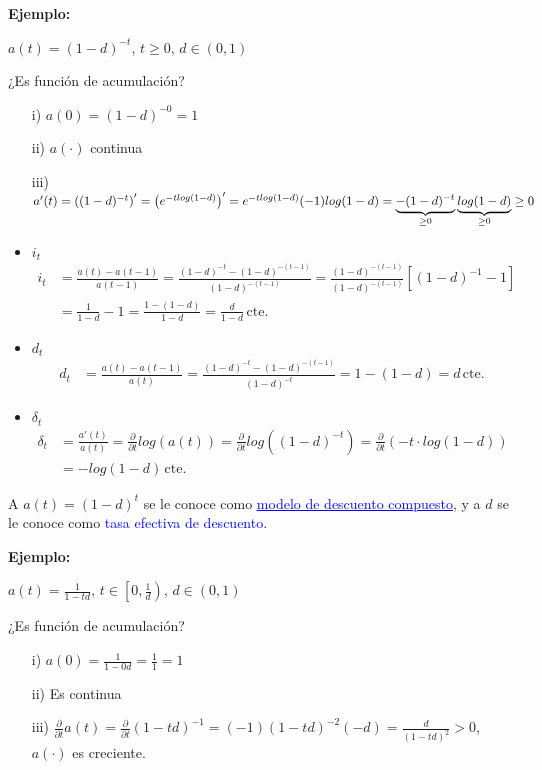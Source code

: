 \textbf{Ejemplo:}

$a(t) = (1-d)^{-t}$, $t\geq 0$, $d\in (0,1)$

¿Es función de acumulación?
\begin{enumerate}
\item[i)] $a(0) = (1-d)^{-0} = 1$
\item[ii)] $a(\cdot)$ continua
\item[iii)] $a'(t) = \left( (1-d)^{-t}\right)' = \left( e^{-tlog(1-d)}\right)'
= e^{-tlog(1-d)}(-1)log(1-d) \\ = \underbrace{-(1-d)^{-t}}_{\geq 0} \underbrace{log(1-d)}_{\geq 0} \geq 0$
\end{enumerate}


\begin{itemize}
\item $i_t$
\begin{align*}
i_t &= \frac{a(t)-a(t-1)}{a(t-1)} = \frac{(1-d)^{-t}-(1-d)^{-(t-1)}}{(1-d)^{-(t-1)}} = \frac{(1-d)^{-(t-1)}}{(1-d)^{-(t-1)}}\left[(1-d)^{-1} - 1 \right] \\
&= \frac{1}{1-d}-1 = \frac{1-(1-d)}{1-d} = \boxed{\frac{d}{1-d} \, \text{cte.}}
\end{align*}
\item $d_t$
\begin{align*}
d_t &=  \frac{a(t) - a(t-1)}{a(t)} = \frac{(1-d)^{-t} - (1-d)^{-(t-1)}}{(1-d)^{-t}} = 1-(1-d) = \boxed{d \, \text{cte.}}
\end{align*}
\item $\delta_t$
\begin{align*}
\delta_t &= \frac{a'(t)}{a(t)} = \frac{\partial}{\partial t} log(a(t)) = \frac{\partial}{\partial t} log\left( (1-d)^{-t}\right) = \frac{\partial}{\partial t} (-t\cdot log(1-d))\\
& = \boxed{-log(1-d)  \, \text{cte.}}
\end{align*}
\end{itemize}

A $\boxed{a(t) = (1-d)^t}$ se le conoce como \textcolor{blue}{\underline{modelo de descuento compuesto}}, y a \underline{$d$} se le conoce como \textcolor{blue}{tasa efectiva de descuento}.

\textbf{Ejemplo:}

$a(t) = \frac{1}{1-td}$, $t\in \left[0, \frac{1}{d} \right)$, $d\in (0,1)$

¿Es función de acumulación?
\begin{enumerate}
\item[i)] $a(0) = \frac{1}{1-0d} = \frac{1}{1} = 1$
\item[ii)] Es continua
\item[iii)] $\frac{\partial}{\partial t} a(t) = \frac{\partial}{\partial t} (1 - td)^{-1} = (-1)(1-td)^{-2}(-d) = \frac{d}{(1-td)^2} > 0$, $a(\cdot)$ es creciente.
\end{enumerate}

